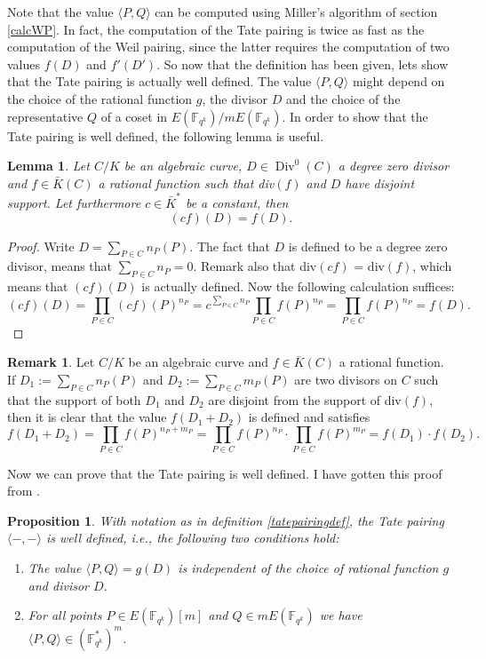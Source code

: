 \documentclass{article}
\numberwithin{equation}{section}
\newtheorem{lemma}[theorem]{Lemma}
\newtheorem{proposition}[theorem]{Proposition}
\theoremstyle{definition}
\newtheorem{remark}[theorem]{Remark}
\newcommand{\FF}[1]{{\mathbb F}_{#1}} %
\newcommand{\Div}{\operatorname{Div}} %
\begin{document}
Note that the value $\langle P,Q \rangle$ can be computed using Miller's algorithm of section \ref{calcWP}. In fact, the computation of the Tate pairing is twice as fast as the computation of the Weil pairing, since the latter requires the computation of two values $f(D)$ and $f'(D')$. So now that the definition has been given, lets show that the Tate pairing is actually well defined. The value $\langle P,Q \rangle$ might depend on the choice of the rational function $g$, the divisor $D$ and the choice of the representative $Q$ of a coset in $E(\FF{q^k})/mE(\FF{q^k})$. In order to show that the Tate pairing is well defined, the following lemma is useful.

\begin{lemma}
Let $C/K$ be an algebraic curve, $D \in \Div^0(C)$ a degree zero divisor and $f \in \bar{K}(C)$ a rational function such that div$(f)$ and $D$ have disjoint support. Let furthermore $c \in \bar{K}^*$ be a constant, then $$(cf)(D)=f(D).$$
\end{lemma}

\begin{proof}
Write $D=\sum_{P \in C} n_P(P)$. The fact that $D$ is defined to be a degree zero divisor, means that $\sum_{P \in C} n_P= 0$. Remark also that div$(cf)$ = div$(f)$, which means that $(cf)(D)$ is actually defined. Now the following calculation suffices: $$ (cf)(D) = \prod_{P \in C} (cf)(P)^{n_P} = c^{\sum_{P \in C} n_P} \prod_{P \in C} f(P)^{n_P} = \prod_{P \in C} f(P)^{n_P}=f(D). $$
\end{proof}

\begin{remark}
Let $C/K$ be an algebraic curve and $f \in \bar{K}(C)$ a rational function. If $D_1:=\sum_{P \in C} n_P(P)$ and $D_2:=\sum_{P \in C} m_P (P)$ are two divisors on $C$ such that the support of both $D_1$ and $D_2$ are disjoint from the support of div$(f)$, then it is clear that the value $f(D_1+D_2)$ is defined and satisfies $$f(D_1+D_2) = \prod_{P\in C} f(P)^{n_P+m_P} = \prod_{P \in C} f(P)^{n_P} \cdot \prod_{P \in C} f(P)^{m_P} = f(D_1) \cdot f(D_2).$$
\end{remark}

Now we can prove that the Tate pairing is well defined. I have gotten this proof from \cite[IX.4.]{blake2}.

\begin{proposition}\label{Tpairingwelldef}
With notation as in definition \ref{tatepairingdef}, the Tate pairing $\langle -,- \rangle$ is well defined, i.e., the following two conditions hold:
\begin{enumerate}
\item The value $\langle P,Q \rangle = g(D)$ is independent of the choice of rational function $g$ and divisor $D$.
\item For all points $P \in E(\FF{q^k})[m]$ and $Q \in mE(\FF{q^k})$ we have $\langle P,Q \rangle \in (\FF{q^k}^*)^m$.
\end{enumerate}
\end{proposition}
\end{document}
